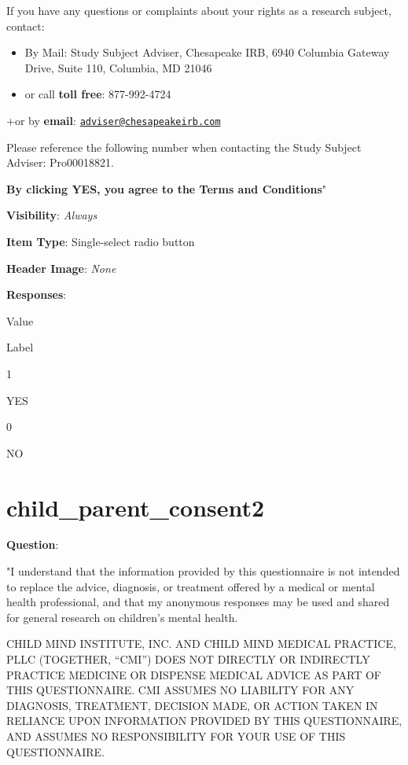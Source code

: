 \documentclass[]{book}
\begin{document}
If you have any questions or complaints about your rights as a research subject, contact:

\begin{itemize}
\item
  By Mail: Study Subject Adviser, Chesapeake IRB, 6940 Columbia Gateway Drive, Suite 110, Columbia, MD 21046
\item
  or call \textbf{toll free}: 877-992-4724
\end{itemize}

+or by \textbf{email}: \href{mailto:adviser@chesapeakeirb.com}{\nolinkurl{adviser@chesapeakeirb.com}}

Please reference the following number when contacting the Study Subject Adviser: Pro00018821.

\textbf{By clicking YES, you agree to the Terms and Conditions}"

\textbf{Visibility}: \emph{Always}

\textbf{Item Type}: Single-select radio button

\textbf{Header Image}: \emph{None}

\textbf{Responses}:

Value

Label

1

YES

0

NO

\hypertarget{child_parent_consent2}{%
\section{child\_parent\_consent2}\label{child_parent_consent2}}

\textbf{Question}:

"I understand that the information provided by this questionnaire is not intended to replace the advice, diagnosis, or treatment offered by a medical or mental health professional, and that my anonymous responses may be used and shared for general research on children's mental health.

CHILD MIND INSTITUTE, INC. AND CHILD MIND MEDICAL PRACTICE, PLLC (TOGETHER, ``CMI'') DOES NOT DIRECTLY OR INDIRECTLY PRACTICE MEDICINE OR DISPENSE MEDICAL ADVICE AS PART OF THIS QUESTIONNAIRE. CMI ASSUMES NO LIABILITY FOR ANY DIAGNOSIS, TREATMENT, DECISION MADE, OR ACTION TAKEN IN RELIANCE UPON INFORMATION PROVIDED BY THIS QUESTIONNAIRE, AND ASSUMES NO RESPONSIBILITY FOR YOUR USE OF THIS QUESTIONNAIRE.
\end{document}
